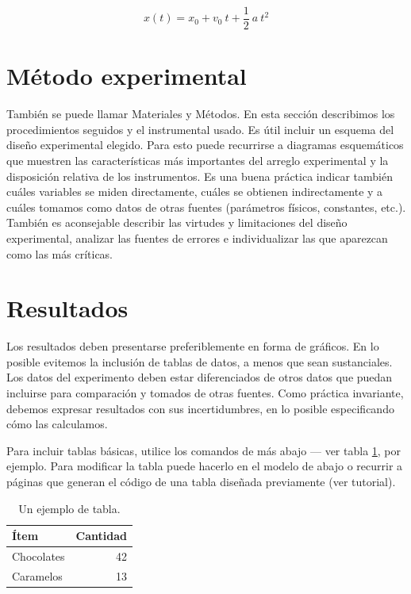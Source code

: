 \documentclass{article}
\begin{document}
\begin{equation}
\label{ecuacion1}
x(t)=x_{0}+v_{0}\: t+\frac{1}{2}\: a\: t^{2}
\end{equation}

\section*{Método experimental}

También se puede llamar Materiales y Métodos. En esta sección describimos los procedimientos seguidos y el instrumental usado. Es útil incluir un esquema del diseño experimental elegido. Para esto puede recurrirse a diagramas esquemáticos que muestren las características más importantes del arreglo experimental y la disposición relativa de los instrumentos. Es una buena práctica indicar también cuáles variables se miden directamente, cuáles se obtienen indirectamente y a cuáles tomamos como datos de otras fuentes (parámetros físicos, constantes, etc.). También es aconsejable describir las virtudes y limitaciones del diseño experimental, analizar las fuentes de errores e individualizar las que aparezcan como las más críticas.



\section*{Resultados}

Los resultados deben presentarse preferiblemente en forma de gráficos. En lo posible evitemos la inclusión de tablas de datos, a menos que sean sustanciales. Los datos del experimento deben estar diferenciados de otros datos que puedan incluirse para comparación y tomados de otras fuentes. Como práctica invariante, debemos expresar resultados con sus incertidumbres, en lo posible especificando cómo las calculamos. 

Para incluir tablas básicas, utilice los comandos de más abajo --- ver tabla \ref{tabla}, por ejemplo. Para modificar la tabla puede hacerlo en el modelo de abajo o recurrir a páginas que generan el código de una tabla diseñada previamente (ver tutorial).

\begin{table}
\centering
\caption{\label{tabla}Un ejemplo de tabla.}
\bigskip
\begin{tabular}{l|r}
Ítem & Cantidad \\\hline
Chocolates & 42 \\
Caramelos & 13
\end{tabular}
\end{table}
\end{document}
